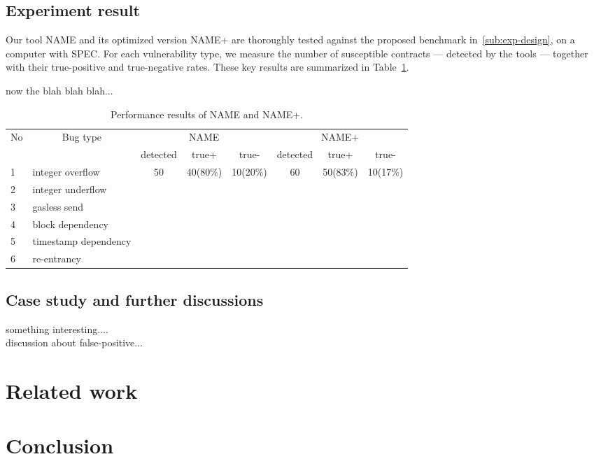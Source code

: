 \documentclass[runningheads]{llncs}
\newcommand{\ct}[1]{{\color{red}#1}}
\begin{document}
\subsection{Experiment result}

Our tool \ct{NAME} and its optimized version \ct{NAME+} are thoroughly tested against the proposed benchmark in~\ref{sub:exp-design}, on a computer with \ct{SPEC}. For each vulnerability type, we measure the number of susceptible contracts --- detected by the tools --- together with their true-positive and true-negative rates.  These key results are summarized in Table~\ref{table:exp}.

\ct{now the blah blah blah...}

\begin{table}[t]
	\centering
\begin{tabular}{|l|l|c|c|c|c|c|c|}
	\hline
	\multirow{2}{*}{No} & \multicolumn{1}{c|}{\multirow{2}{*}{Bug type}} & \multicolumn{3}{c|}{NAME}      & \multicolumn{3}{c|}{NAME+}     \\ \cline{3-8} 
	& \multicolumn{1}{c|}{}                          & detected & true+    & true-    & detected & true+    & true-    \\ \hline
	1                   & integer overflow                               & 50       & 40(80\%) & 10(20\%) & 60       & 50(83\%) & 10(17\%) \\ \hline
	2                   & integer underflow                              &          &          &          &          &          &          \\ \hline
	3                   & gasless send                                   &          &          &          &          &          &          \\ \hline
	4                   & block dependency                               &          &          &          &          &          &          \\ \hline
	5                   & timestamp dependency                           &          &          &          &          &          &          \\ \hline
	6                   & re-entrancy                                    &          &          &          &          &          &          \\ \hline
\end{tabular}
\vspace{1em}
\caption{Performance results of \ct{NAME} and \ct{NAME+}.}\label{table:exp}
\end{table}

\subsection{Case study and further discussions}
\ct{something interesting....}
\\
\ct{discussion about false-positive...}

\section{Related work}

\section{Conclusion}

 
\end{document}
